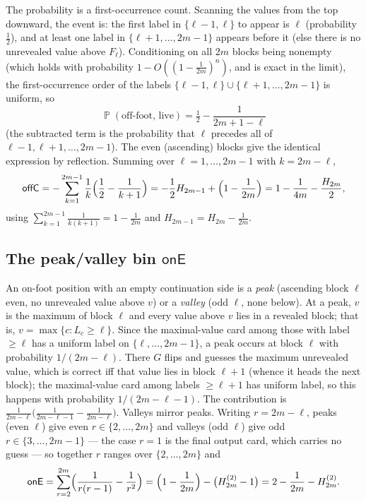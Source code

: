 \documentclass[11pt]{article}
\theoremstyle{definition}
\DeclareMathOperator{\PP}{\mathbb{P}}
\newcommand{\bigoh}{O}
\begin{document}
The probability is a first-occurrence count. Scanning the values from the top downward, the
event is: the first label in $\{\ell-1,\ell\}$ to appear is $\ell$ (probability $\tfrac12$),
and at least one label in $\{\ell+1,\dots,2m-1\}$ appears before it (else there is no
unrevealed value above $F_\ell$). Conditioning on all $2m$ blocks being nonempty (which holds
with probability $1-\bigoh((1-\tfrac1{2m})^n)$, and is exact in the limit), the first-occurrence
order of the labels $\{\ell-1,\ell\}\cup\{\ell+1,\dots,2m-1\}$ is uniform, so
\[
  \PP(\text{off-foot, live})=\tfrac12-\frac{1}{2m+1-\ell}
\]
(the subtracted term is the probability that $\ell$ precedes all of $\ell-1,\ell+1,\dots,2m-1$).
The even (ascending) blocks give the identical expression by reflection. Summing over
$\ell=1,\dots,2m-1$ with $k=2m-\ell$,
\[
  \mathsf{offC}=-\sum_{k=1}^{2m-1}\frac1k\Bigl(\frac12-\frac1{k+1}\Bigr)
  =-\frac12 H_{2m-1}+\Bigl(1-\frac1{2m}\Bigr)
  =1-\frac1{4m}-\frac{H_{2m}}{2},
\]
using $\sum_{k=1}^{2m-1}\frac1{k(k+1)}=1-\frac1{2m}$ and $H_{2m-1}=H_{2m}-\frac1{2m}$.

\subsection{The peak/valley bin \texorpdfstring{$\mathsf{onE}$}{onE}}
An on-foot position with an empty continuation side is a \emph{peak} (ascending block $\ell$
even, no unrevealed value above $v$) or a \emph{valley} (odd $\ell$, none below). At a peak,
$v$ is the maximum of block $\ell$ and every value above $v$ lies in a revealed block; that is,
$v=\max\{c:L_c\ge\ell\}$. Since the maximal-value card among those with label $\ge\ell$ has a
uniform label on $\{\ell,\dots,2m-1\}$, a peak occurs at block $\ell$ with probability
$1/(2m-\ell)$. There $G$ flips and guesses the maximum unrevealed value, which is correct iff
that value lies in block $\ell+1$ (whence it heads the next block); the maximal-value card among
labels $\ge\ell+1$ has uniform label, so this happens with probability $1/(2m-\ell-1)$. The
contribution is $\frac{1}{2m-\ell}\bigl(\frac{1}{2m-\ell-1}-\frac{1}{2m-\ell}\bigr)$. Valleys
mirror peaks. Writing $r=2m-\ell$, peaks (even $\ell$) give even $r\in\{2,\dots,2m\}$ and
valleys (odd $\ell$) give odd $r\in\{3,\dots,2m-1\}$ --- the case $r=1$ is the final output
card, which carries no guess --- so together $r$ ranges over $\{2,\dots,2m\}$ and
\[
  \mathsf{onE}=\sum_{r=2}^{2m}\Bigl(\frac{1}{r(r-1)}-\frac1{r^2}\Bigr)
  =\Bigl(1-\frac1{2m}\Bigr)-\bigl(H_{2m}^{(2)}-1\bigr)
  =2-\frac1{2m}-H_{2m}^{(2)}.
\]
\end{document}
